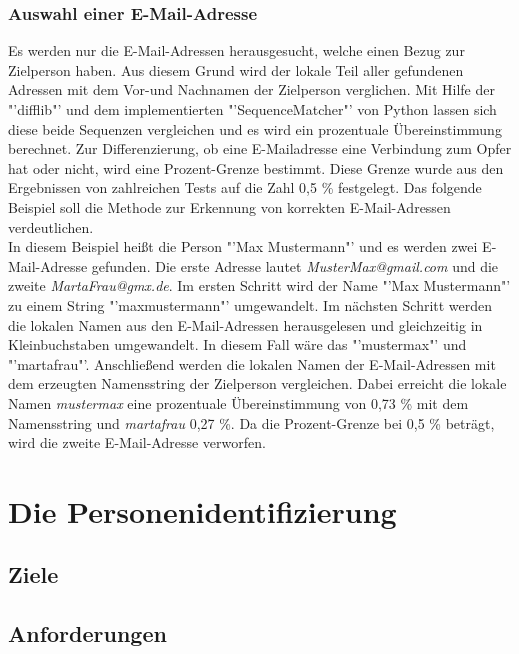 		\subsubsection{Auswahl einer E-Mail-Adresse}
		Es werden nur die E-Mail-Adressen herausgesucht, welche einen Bezug zur Zielperson haben. Aus diesem Grund wird der lokale Teil aller gefundenen Adressen mit dem Vor-und Nachnamen der Zielperson verglichen. Mit Hilfe der "'difflib"' und dem implementierten "'SequenceMatcher"' von Python lassen sich diese beide Sequenzen vergleichen und es wird ein prozentuale Übereinstimmung berechnet. Zur Differenzierung, ob eine E-Mailadresse eine Verbindung zum Opfer hat oder nicht, wird eine Prozent-Grenze bestimmt. Diese Grenze wurde aus den Ergebnissen von zahlreichen Tests auf die Zahl 0,5 \% festgelegt. Das folgende Beispiel soll die Methode zur Erkennung von korrekten E-Mail-Adressen verdeutlichen.\\
		In diesem Beispiel heißt die Person "'Max Mustermann"' und es werden zwei E-Mail-Adresse gefunden. Die erste Adresse lautet \textit{MusterMax@gmail.com} und die zweite \textit{MartaFrau@gmx.de}. Im ersten Schritt wird der Name "'Max Mustermann"' zu einem String "'maxmustermann"' umgewandelt. Im nächsten Schritt werden die lokalen Namen aus den E-Mail-Adressen herausgelesen und gleichzeitig in Kleinbuchstaben umgewandelt. In diesem Fall wäre das "'mustermax"' und "'martafrau"'. Anschließend werden die lokalen Namen der E-Mail-Adressen mit dem erzeugten Namensstring der Zielperson vergleichen. Dabei erreicht die lokale Namen \textit{mustermax} eine prozentuale Übereinstimmung von 0,73 \% mit dem Namensstring und \textit{martafrau} 0,27 \%. Da die Prozent-Grenze bei 0,5 \% beträgt, wird die zweite E-Mail-Adresse verworfen.

\section{Die Personenidentifizierung}
	\subsection{Ziele}
	
	\subsection{Anforderungen}
